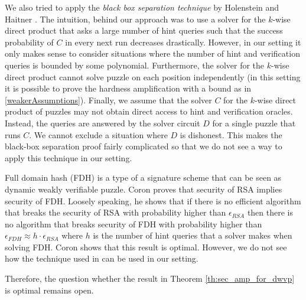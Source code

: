 We also tried to apply the \textit{black box separation technique} by Holenstein and Haitner \cite{haitner2009possibility}.
The intuition, behind our approach was to use a solver for the $k$-wise direct product that asks a large number of hint queries such that
the success probability of $C$ in every next run decreases drastically.
However, in our setting it only makes sense to consider situations where the number of hint and verification queries is bounded by some polynomial.
Furthermore, the solver for the $k$-wise direct product cannot solve puzzle on each position independently (in this setting it is possible
to prove the hardness amplification with a bound as in \ref{weakerAssumptions}).
Finally, we assume that the solver $C$ for the $k$-wise direct product of puzzles may not obtain direct access to hint and verification oracles.
Instead, the queries are answered by the solver circuit $D$ for a single puzzle that runs $C$. We cannot exclude a situation where $D$ is dishonest.
This makes the black-box separation proof fairly complicated so that we do not see a way to apply this technique in our setting.

Full domain hash (FDH) is a type of a signature scheme that can be seen as dynamic weakly verifiable puzzle.
Coron \cite{coron2000exact, coron2002optimal} proves that security of RSA implies security of FDH.
Loosely speaking, he shows that if there is no efficient algorithm that breaks the security of RSA with probability higher
than $\epsilon_{\mathit{RSA}}$ then there is no algorithm that breaks security of FDH with probability higher than
$\epsilon_{\mathit{FDH}} \approx h \cdot \epsilon_{\mathit{RSA}}$ where $h$ is the number of hint queries that a solver makes when solving FDH.
Coron shows that this result is optimal. However, we do not see how the technique used in \cite{coron2002optimal} can be used in our setting.

Therefore, the question whether the result in Theorem \ref{th:sec_amp_for_dwvp} is optimal remains open.

